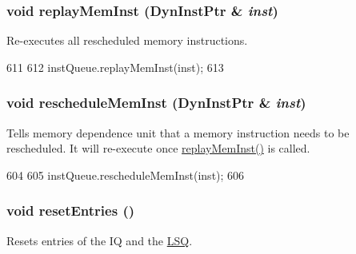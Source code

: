 \hypertarget{classDefaultIEW_ae165df775b4de9e9430228c7f04c2bc9}{
\subsubsection[{replayMemInst}]{\setlength{\rightskip}{0pt plus 5cm}void replayMemInst ({\bf DynInstPtr} \& {\em inst})}}
\label{classDefaultIEW_ae165df775b4de9e9430228c7f04c2bc9}
Re-\/executes all rescheduled memory instructions. 


\begin{DoxyCode}
611 {
612     instQueue.replayMemInst(inst);
613 }
\end{DoxyCode}
\hypertarget{classDefaultIEW_aa9c46f45f491ef90a936c7e2b95f20aa}{
\subsubsection[{rescheduleMemInst}]{\setlength{\rightskip}{0pt plus 5cm}void rescheduleMemInst ({\bf DynInstPtr} \& {\em inst})}}
\label{classDefaultIEW_aa9c46f45f491ef90a936c7e2b95f20aa}
Tells memory dependence unit that a memory instruction needs to be rescheduled. It will re-\/execute once \hyperlink{classDefaultIEW_ae165df775b4de9e9430228c7f04c2bc9}{replayMemInst()} is called. 


\begin{DoxyCode}
604 {
605     instQueue.rescheduleMemInst(inst);
606 }
\end{DoxyCode}
\hypertarget{classDefaultIEW_aaf9a05771a835f9f8d634cef36e24d40}{
\subsubsection[{resetEntries}]{\setlength{\rightskip}{0pt plus 5cm}void resetEntries ()}}
\label{classDefaultIEW_aaf9a05771a835f9f8d634cef36e24d40}
Resets entries of the IQ and the \hyperlink{classLSQ}{LSQ}. 


